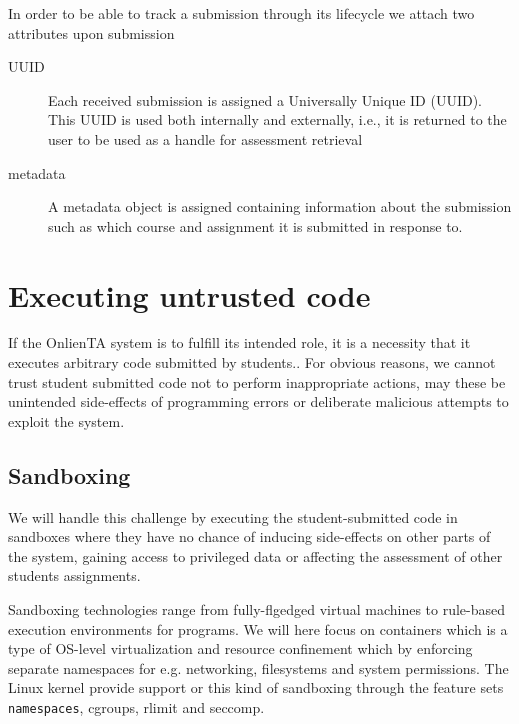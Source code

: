 In order to be able to track a submission through its lifecycle we
attach two attributes upon submission
\begin{description}
\item[UUID] Each received submission is assigned a Universally
  Unique ID (UUID). This UUID is used both internally and externally,
  i.e., it is returned to the user to be used as a handle for
  assessment retrieval
\item[metadata] A metadata object is assigned containing information
  about the submission such as which course and assignment it is
  submitted in response to.
\end{description}



\section{Executing untrusted code}
If the OnlienTA system is to fulfill its intended role, it is a
necessity that it executes arbitrary code submitted by
students.. For obvious reasons, we cannot trust
student submitted code not to perform inappropriate actions, may these
be unintended side-effects of programming errors or deliberate
malicious attempts to exploit the system.

\subsection{Sandboxing}
We will handle this challenge by executing the student-submitted code
in sandboxes where they have no chance of inducing side-effects on
other parts of the system, gaining access to privileged data or
affecting the assessment of other students assignments.


Sandboxing technologies range from fully-flgedged virtual machines to
rule-based execution environments for programs. We will here focus on
containers which is a type of OS-level virtualization and resource
confinement which  by enforcing separate
namespaces for e.g. networking, filesystems and system
permissions. The Linux kernel provide support or this kind of
sandboxing through the feature sets
\texttt{namespaces}\cite{namespaces}, cgroups, rlimit and seccomp.

